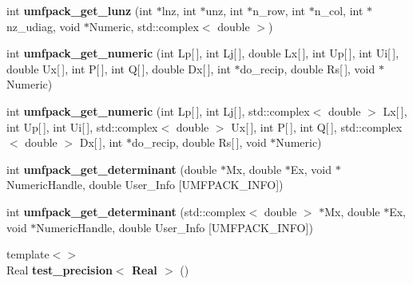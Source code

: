 \begin{DoxyCompactItemize}
\item 
\mbox{\label{namespace_eigen_ae8aae2a0d71f002142ebaf0dcb96f097}} 
int {\bfseries umfpack\+\_\+get\+\_\+lunz} (int $\ast$lnz, int $\ast$unz, int $\ast$n\+\_\+row, int $\ast$n\+\_\+col, int $\ast$nz\+\_\+udiag, void $\ast$Numeric, std\+::complex$<$ double $>$)
\item 
\mbox{\label{namespace_eigen_a435266948cde73ddd933b5c9aa3948f0}} 
int {\bfseries umfpack\+\_\+get\+\_\+numeric} (int Lp\mbox{[}$\,$\mbox{]}, int Lj\mbox{[}$\,$\mbox{]}, double Lx\mbox{[}$\,$\mbox{]}, int Up\mbox{[}$\,$\mbox{]}, int Ui\mbox{[}$\,$\mbox{]}, double Ux\mbox{[}$\,$\mbox{]}, int P\mbox{[}$\,$\mbox{]}, int Q\mbox{[}$\,$\mbox{]}, double Dx\mbox{[}$\,$\mbox{]}, int $\ast$do\+\_\+recip, double Rs\mbox{[}$\,$\mbox{]}, void $\ast$Numeric)
\item 
\mbox{\label{namespace_eigen_aab180284eb73eef50710704885570e29}} 
int {\bfseries umfpack\+\_\+get\+\_\+numeric} (int Lp\mbox{[}$\,$\mbox{]}, int Lj\mbox{[}$\,$\mbox{]}, std\+::complex$<$ double $>$ Lx\mbox{[}$\,$\mbox{]}, int Up\mbox{[}$\,$\mbox{]}, int Ui\mbox{[}$\,$\mbox{]}, std\+::complex$<$ double $>$ Ux\mbox{[}$\,$\mbox{]}, int P\mbox{[}$\,$\mbox{]}, int Q\mbox{[}$\,$\mbox{]}, std\+::complex$<$ double $>$ Dx\mbox{[}$\,$\mbox{]}, int $\ast$do\+\_\+recip, double Rs\mbox{[}$\,$\mbox{]}, void $\ast$Numeric)
\item 
\mbox{\label{namespace_eigen_a264775b84fb6755d00773bf2d6408f27}} 
int {\bfseries umfpack\+\_\+get\+\_\+determinant} (double $\ast$Mx, double $\ast$Ex, void $\ast$Numeric\+Handle, double User\+\_\+\+Info \mbox{[}U\+M\+F\+P\+A\+C\+K\+\_\+\+I\+N\+FO\mbox{]})
\item 
\mbox{\label{namespace_eigen_a4102e7905b2c1ee9836121d9b5834063}} 
int {\bfseries umfpack\+\_\+get\+\_\+determinant} (std\+::complex$<$ double $>$ $\ast$Mx, double $\ast$Ex, void $\ast$Numeric\+Handle, double User\+\_\+\+Info \mbox{[}U\+M\+F\+P\+A\+C\+K\+\_\+\+I\+N\+FO\mbox{]})
\item 
\mbox{\label{namespace_eigen_a8b3c5cef3b8c53fa6c69aa2f608a5888}} 
{\footnotesize template$<$$>$ }\\Real {\bfseries test\+\_\+precision$<$ Real $>$} ()

\end{DoxyCompactItemize}
